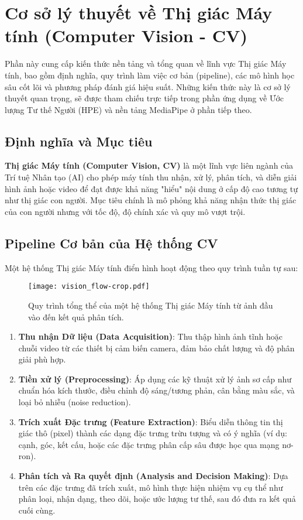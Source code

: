 \section{Cơ sở lý thuyết về Thị giác Máy tính (Computer Vision - CV)}

Phần này cung cấp kiến thức nền tảng và tổng quan về lĩnh vực Thị giác Máy tính, bao gồm định nghĩa, quy trình làm việc cơ bản (pipeline), các mô hình học sâu cốt lõi và phương pháp đánh giá hiệu suất. Những kiến thức này là cơ sở lý thuyết quan trọng, sẽ được tham chiếu trực tiếp trong phần ứng dụng về Ước lượng Tư thế Người (HPE) và nền tảng MediaPipe ở phần tiếp theo.

\subsection{Định nghĩa và Mục tiêu}
\textbf{Thị giác Máy tính (Computer Vision, CV)} là một lĩnh vực liên ngành của Trí tuệ Nhân tạo (AI) cho phép máy tính thu nhận, xử lý, phân tích, và diễn giải hình ảnh hoặc video để đạt được khả năng "hiểu" nội dung ở cấp độ cao tương tự như thị giác con người. Mục tiêu chính là mô phỏng khả năng nhận thức thị giác của con người nhưng với tốc độ, độ chính xác và quy mô vượt trội.

\subsection{Pipeline Cơ bản của Hệ thống CV}
Một hệ thống Thị giác Máy tính điển hình hoạt động theo quy trình tuần tự sau:


\begin{figure}[h]
    \centering
    \texttt{[image: vision\_flow-crop.pdf]}
    \caption{Quy trình tổng thể của một hệ thống Thị giác Máy tính từ ảnh đầu vào đến kết quả phân tích.}
    \label{fig:cv_pipeline}
\end{figure}

\begin{enumerate}
    \item \textbf{Thu nhận Dữ liệu (Data Acquisition)}: Thu thập hình ảnh tĩnh hoặc chuỗi video từ các thiết bị cảm biến camera, đảm bảo chất lượng và độ phân giải phù hợp.
    \item \textbf{Tiền xử lý (Preprocessing)}: Áp dụng các kỹ thuật xử lý ảnh sơ cấp như chuẩn hóa kích thước, điều chỉnh độ sáng/tương phản, cân bằng màu sắc, và loại bỏ nhiễu (noise reduction).
    \item \textbf{Trích xuất Đặc trưng (Feature Extraction)}: Biểu diễn thông tin thị giác thô (pixel) thành các dạng đặc trưng trừu tượng và có ý nghĩa (ví dụ: cạnh, góc, kết cấu, hoặc các đặc trưng phân cấp sâu được học qua mạng nơ-ron).
    \item \textbf{Phân tích và Ra quyết định (Analysis and Decision Making)}: Dựa trên các đặc trưng đã trích xuất, mô hình thực hiện nhiệm vụ cụ thể như phân loại, nhận dạng, theo dõi, hoặc ước lượng tư thế, sau đó đưa ra kết quả cuối cùng.
\end{enumerate}

